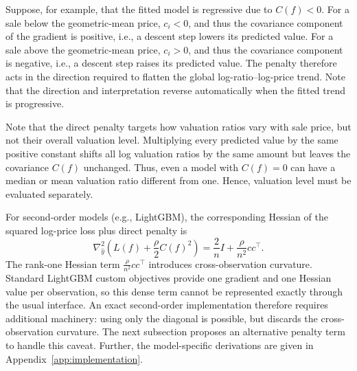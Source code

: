 \documentclass[10pt]{article}
\theoremstyle{definition}
\newcommand{\1}{\mathbf{1}}
\newcommand{\oldtext}[1]{\textcolor{blue}{\sout{#1}}}
\newcommand{\newtext}[1]{\textcolor{impGreen}{#1}}
\begin{document}
{Suppose, for example, that the fitted model is regressive due to $C(f)<0$. For a sale below the geometric-mean price, $c_i<0$, and thus the covariance component of the gradient is positive, i.e., a descent step lowers its predicted value. For a sale above the geometric-mean price, $c_i>0$, and thus the covariance component is negative, i.e., a descent step raises its predicted value. The penalty therefore acts in the direction required to flatten the global log-ratio--log-price trend. Note that the direction and interpretation reverse automatically when the fitted trend is progressive.}


Note that the direct penalty targets how valuation ratios vary with sale price, but not their 
\newtext{overall valuation level}. Multiplying every predicted value by the same positive constant shifts all log valuation ratios by the same amount but leaves the covariance $C(f)$ unchanged. Thus, even a model with $C(f)=0$ can have a median or mean valuation ratio different from one. Hence, valuation level must be evaluated separately.



{For second-order models (e.g., LightGBM), the corresponding Hessian of the squared log-price loss plus direct penalty is}
{
\begin{equation}
\label{eq:direct_gradient_hessian}
\nabla_{\widehat y}^2
\left(
L(f)+\frac{\rho}{2}C(f)^2
\right)
=
\frac{2}{n}I+\frac{\rho}{n^2}cc^\top.
\end{equation}
}
The rank-one Hessian term $\frac{\rho}{n^{2}}cc^\top$ introduces cross-observation curvature. Standard LightGBM custom objectives provide one gradient and one Hessian value per observation, so this dense term cannot be represented exactly through the usual interface. An exact second-order implementation therefore requires additional machinery: using only the diagonal is possible, but discards the cross-observation curvature. The next subsection proposes an alternative penalty term to handle this caveat. Further, the model-specific derivations are given in Appendix~\ref{app:implementation}.
\end{document}
